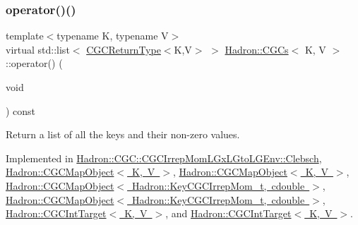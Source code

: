 \mbox{\label{classHadron_1_1CGCs_ac709374b31c0319e82028b9d7c23e993}} 
\subsubsection{\texorpdfstring{operator()()}{operator()()}\hspace{0.1cm}{\footnotesize\ttfamily [2/4]}}
{\footnotesize\ttfamily template$<$typename K, typename V$>$ \\
virtual std\+::list$<$ \mbox{\hyperlink{structHadron_1_1CGCReturnType}{C\+G\+C\+Return\+Type}}$<$K,V$>$ $>$ \mbox{\hyperlink{classHadron_1_1CGCs}{Hadron\+::\+C\+G\+Cs}}$<$ K, V $>$\+::operator() (\begin{DoxyParamCaption}\item[{void}]{ }\end{DoxyParamCaption}) const\hspace{0.3cm}{\ttfamily [pure virtual]}}



Return a list of all the keys and their non-\/zero values. 



Implemented in \mbox{\hyperlink{classHadron_1_1CGC_1_1CGCIrrepMomLGxLGtoLGEnv_1_1Clebsch_a27a81332c929b1f421704680e794b796}{Hadron\+::\+C\+G\+C\+::\+C\+G\+C\+Irrep\+Mom\+L\+Gx\+L\+Gto\+L\+G\+Env\+::\+Clebsch}}, \mbox{\hyperlink{classHadron_1_1CGCMapObject_aaa4b18e1a2845e16154cd434462c0779}{Hadron\+::\+C\+G\+C\+Map\+Object$<$ K, V $>$}}, \mbox{\hyperlink{classHadron_1_1CGCMapObject_aaa4b18e1a2845e16154cd434462c0779}{Hadron\+::\+C\+G\+C\+Map\+Object$<$ K, V $>$}}, \mbox{\hyperlink{classHadron_1_1CGCMapObject_aaa4b18e1a2845e16154cd434462c0779}{Hadron\+::\+C\+G\+C\+Map\+Object$<$ Hadron\+::\+Key\+C\+G\+C\+Irrep\+Mom\+\_\+t, cdouble $>$}}, \mbox{\hyperlink{classHadron_1_1CGCMapObject_aaa4b18e1a2845e16154cd434462c0779}{Hadron\+::\+C\+G\+C\+Map\+Object$<$ Hadron\+::\+Key\+C\+G\+C\+Irrep\+Mom\+\_\+t, cdouble $>$}}, \mbox{\hyperlink{classHadron_1_1CGCIntTarget_ae6c0ce90fe1f8a2880984df1e2e44c18}{Hadron\+::\+C\+G\+C\+Int\+Target$<$ K, V $>$}}, and \mbox{\hyperlink{classHadron_1_1CGCIntTarget_ae6c0ce90fe1f8a2880984df1e2e44c18}{Hadron\+::\+C\+G\+C\+Int\+Target$<$ K, V $>$}}.

\mbox{\label{classHadron_1_1CGCs_a8d2d80be37b603359708ebdd5923ff47}} 
